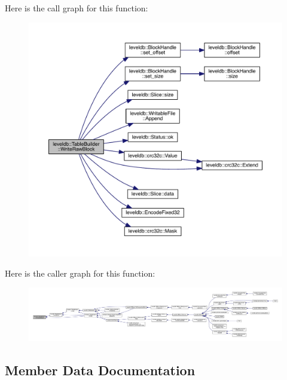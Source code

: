 Here is the call graph for this function\+:\nopagebreak
\begin{figure}[H]
\begin{center}
\leavevmode
\includegraphics[width=350pt]{classleveldb_1_1_table_builder_a71b5778acf8621153f96dffc51ef1b29_cgraph}
\end{center}
\end{figure}




Here is the caller graph for this function\+:
\nopagebreak
\begin{figure}[H]
\begin{center}
\leavevmode
\includegraphics[width=350pt]{classleveldb_1_1_table_builder_a71b5778acf8621153f96dffc51ef1b29_icgraph}
\end{center}
\end{figure}




\subsection{Member Data Documentation}
\hypertarget{classleveldb_1_1_table_builder_ab68d537c17c94be9ba6650b1db9bff74}{}
